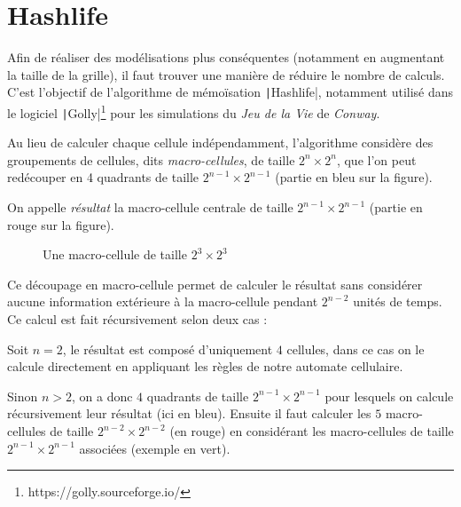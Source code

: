 \documentclass[12pt]{article}
\begin{document}
\section{Hashlife}

Afin de réaliser des modélisations plus conséquentes (notamment en augmentant la taille de la grille), il faut trouver une manière de réduire le nombre de calculs. C'est l'objectif de l'algorithme de mémoïsation \texttt|Hashlife|, notamment utilisé dans le logiciel \texttt|Golly|\footnote{https://golly.sourceforge.io/} pour les simulations du \textit{Jeu de la Vie} de \textit{Conway}.

Au lieu de calculer chaque cellule indépendamment, l'algorithme considère des groupements de cellules, dits \textit{macro-cellules}, de taille $2^n \times 2^n$, que l'on peut redécouper en 4 quadrants de taille $2^{n-1} \times 2^{n-1}$ (partie en bleu sur la figure).

On appelle \textit{résultat} la macro-cellule centrale de taille $2^{n-1} \times 2^{n-1}$ (partie en rouge sur la figure).

\begin{figure}[!ht]
    \centering
    \caption{Une macro-cellule de taille $2^{3} \times 2^{3}$}
\end{figure}

Ce découpage en macro-cellule permet de calculer le résultat sans considérer aucune information extérieure à la macro-cellule pendant $2^{n-2}$ unités de temps. Ce calcul est fait récursivement selon deux cas :

Soit $n = 2$, le résultat est composé d'uniquement $4$ cellules, dans ce cas on le calcule directement en appliquant les règles de notre automate cellulaire.

Sinon $n > 2$, on a donc $4$ quadrants de taille $2^{n-1} \times 2^{n-1}$ pour lesquels on calcule récursivement leur résultat (ici en bleu). Ensuite il faut calculer les $5$ macro-cellules de taille $2^{n-2} \times 2^{n-2}$ (en rouge) en considérant les macro-cellules de taille $2^{n-1} \times 2^{n-1}$ associées (exemple en vert).
\end{document}
